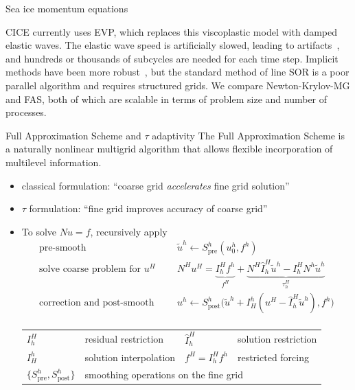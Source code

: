 \documentclass[final,t]{beamer}
\begin{document}
\begin{frame}{}
\begin{columns}
\begin{column}{0.31\textwidth}
\begin{block}{Sea ice momentum equations}
        
        CICE currently uses EVP, which replaces this viscoplastic model with damped elastic waves.
        The elastic wave speed is artificially slowed, leading to artifacts~\cite{lemieux2012jfnkevp,losch2010formulation}, and hundreds or thousands of subcycles are needed for each time step.
        Implicit methods have been more robust~\cite{zhang1997efficient,losch2010formulation}, but the standard method of line SOR is a poor parallel algorithm and requires structured grids.
        We compare Newton-Krylov-MG and FAS, both of which are scalable in terms of problem size and number of processes.
      \end{block}
      \vspace{-2.5em}
      \begin{block}{Full Approximation Scheme and $\tau$ adaptivity}
        The Full Approximation Scheme is a naturally nonlinear multigrid algorithm that allows flexible incorporation of multilevel information.
        \begin{itemize}
        \item classical formulation: ``coarse grid \emph{accelerates} fine grid solution''
        \item $\tau$ formulation: ``fine grid improves accuracy of coarse grid''
        \item To solve $N u = f$, recursively apply
          \begin{equation*}
            \begin{split}
              \text{pre-smooth} \:\: & \quad \tilde u^h \gets S^h_{\text{pre}}(u^h_0, f^h) \\
              \text{solve coarse problem for $u^H$} \:\: & \quad N^H u^H = \underbrace{I_h^H f^h}_{f^H} + \underbrace{N^H \hat I_h^H \tilde u^h - I_h^H N^h \tilde u^h}_{\tau_h^H} \\
              \text{correction and post-smooth} \:\: & \quad u^h \gets S^h_{\text{post}} \Big( \tilde u^h + I_H^h (u^H - \hat I_h^H \tilde u^h), f^h \Big) \\
            \end{split}
          \end{equation*}
          \begin{tabular}{llll}
            \toprule
            $I_h^H$ & residual restriction & $\hat I_h^H$ & solution restriction \\
            $I_H^h$ & solution interpolation & $f^H = I_h^H f^h$ & restricted forcing \\
            $\{S^h_{\text{pre}},S^h_{\text{post}}\}$ & \multicolumn{3}{l}{smoothing operations on the fine grid} \\

\end{tabular}
\end{itemize}
\end{block}
\end{column}
\end{columns}
\end{frame}
\end{document}
